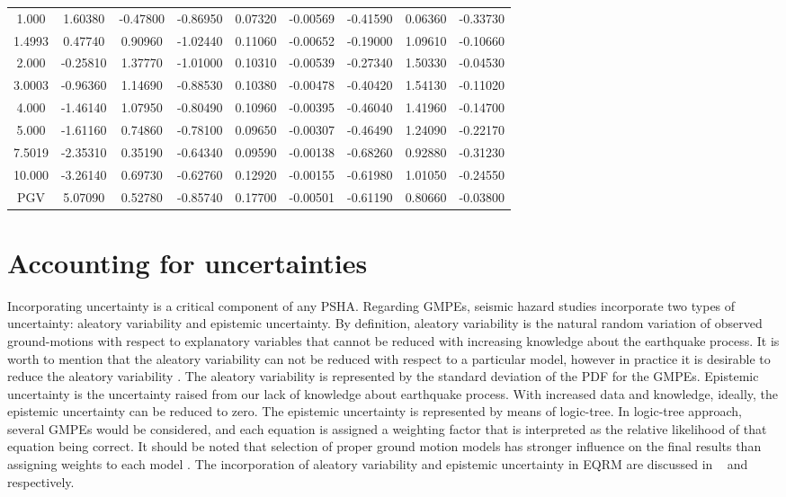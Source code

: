 \begin{table}
\begin{tabular}{ccccccccc}
1.000   & 1.60380  & -0.47800  & -0.86950  & 0.07320   & -0.00569 & -0.41590 & 0.06360  & -0.33730 \\
1.4993  & 0.47740  & 0.90960   & -1.02440  & 0.11060   & -0.00652 & -0.19000 & 1.09610  & -0.10660 \\
2.000   & -0.25810 & 1.37770   & -1.01000  & 0.10310   & -0.00539 & -0.27340 & 1.50330  & -0.04530 \\
3.0003  & -0.96360 & 1.14690   & -0.88530  & 0.10380   & -0.00478 & -0.40420 & 1.54130  & -0.11020 \\
4.000   & -1.46140 & 1.07950   & -0.80490  & 0.10960   & -0.00395 & -0.46040 & 1.41960  & -0.14700 \\
5.000   & -1.61160 & 0.74860   & -0.78100  & 0.09650   & -0.00307 & -0.46490 & 1.24090  & -0.22170 \\
7.5019  & -2.35310 & 0.35190   & -0.64340  & 0.09590   & -0.00138 & -0.68260 & 0.92880  & -0.31230 \\
10.000  & -3.26140 & 0.69730   & -0.62760  & 0.12920   & -0.00155 & -0.61980 & 1.01050  & -0.24550 \\
PGV     & 5.07090  & 0.52780   & -0.85740  & 0.17700   & -0.00501 & -0.61190 & 0.80660  & -0.03800 \\
\hline
\end{tabular}
\end{table}


\normalsize



\section{Accounting for uncertainties}\label{sec:uncertain}
Incorporating uncertainty is a critical component of any PSHA.
Regarding GMPEs, seismic hazard studies incorporate two types of
uncertainty: aleatory variability and epistemic uncertainty. By
definition, aleatory variability is the natural random variation of
observed ground-motions with respect to explanatory variables that
cannot be reduced with increasing knowledge about the earthquake
process. It is worth to mention that the aleatory variability can
not be reduced with respect to a particular model, however in
practice it is desirable to reduce the aleatory variability
\citep{eqrm_Atik10}. The aleatory variability is represented by the
standard deviation of the PDF for the GMPEs. Epistemic uncertainty
is the uncertainty raised from our lack of knowledge about
earthquake process. With increased data and knowledge, ideally, the
epistemic uncertainty can be reduced to zero. The epistemic
uncertainty is represented by means of logic-tree. In logic-tree
approach, several GMPEs would be considered, and each equation is
assigned a weighting factor that is interpreted as the relative
likelihood of that equation being correct. It should be noted that
selection of proper ground motion models has stronger influence on
the final results than assigning weights to each model
\citep{eqrm_Scherbaum05}. The incorporation of aleatory variability
and epistemic uncertainty in EQRM are discussed in
~ and ~
respectively.




